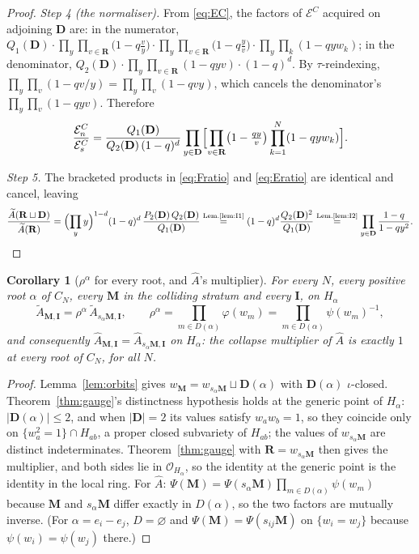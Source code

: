 \documentclass[11pt]{article}
\newtheorem{cor}[thm]{Corollary}
\theoremstyle{definition}
\newcommand{\At}{\widetilde{A}}
\newcommand{\Ah}{\widehat{A}}
\newcommand{\bM}{\mathbf{M}}
\newcommand{\bI}{\mathbf{I}}
\newcommand{\bD}{\mathbf{D}}
\newcommand{\bR}{\mathbf{R}}
\begin{document}
\begin{proof}
\emph{Step 4 (the normaliser).}  From \eqref{eq:EC}, the factors of
$\mathcal{E}^{C}$ acquired on adjoining $\bD$ are: in the numerator,
$Q_1(\bD)\cdot\prod_{y}\prod_{v\in\bR}\bigl(1-q\tfrac{v}{y}\bigr)
 \cdot\prod_y\prod_{v\in\bR}\bigl(1-q\tfrac{y}{v}\bigr)
 \cdot\prod_y\prod_{k}(1-qyw_k)$;
in the denominator, $Q_2(\bD)\cdot\prod_y\prod_{v\in\bR}(1-qyv)\cdot(1-q)^{d}$.
By $\tau$-reindexing, $\prod_{y}\prod_{v}(1-qv/y)=\prod_y\prod_v(1-qvy)$, which
cancels the denominator's $\prod_y\prod_v(1-qyv)$.  Therefore
\begin{equation}\label{eq:Eratio}
  \frac{\mathcal{E}^{C}_{n}}{\mathcal{E}^{C}_{s}}
  =\frac{Q_1(\bD)}{Q_2(\bD)\,(1-q)^{d}}
   \prod_{y\in\bD}\Bigl[\prod_{v\in\bR}\bigl(1-\tfrac{qy}{v}\bigr)
                        \prod_{k=1}^{N}(1-qyw_k)\Bigr].
\end{equation}

\emph{Step 5.}  The bracketed products in \eqref{eq:Fratio} and
\eqref{eq:Eratio} are identical and cancel, leaving
\[
  \frac{\At(\bR\sqcup\bD)}{\At(\bR)}
  =\Bigl(\prod_y y\Bigr)^{1-d}(1-q)^{d}\,\frac{P_2(\bD)\,Q_2(\bD)}{Q_1(\bD)}
  \overset{\text{Lem.\ref{lem:I1}}}{=}(1-q)^{d}\frac{Q_2(\bD)^{2}}{Q_1(\bD)}
  \overset{\text{Lem.\ref{lem:I2}}}{=}\prod_{y\in\bD}\frac{1-q}{1-qy^{2}} . \qedhere
\]
\end{proof}

\begin{cor}[$\rho^{\alpha}$ for every root, and $\Ah$'s multiplier]\label{cor:rho}
For every $N$, every positive root $\alpha$ of $C_N$, every $\bM$ in the colliding
stratum and every $\bI$, on $H_\alpha$
\[
   \At_{\bM,\bI}=\rho^{\alpha}\,\At_{s_\alpha\bM,\bI},
   \qquad
   \rho^{\alpha}=\prod_{m\in D(\alpha)}\varphi(w_m)=\prod_{m\in D(\alpha)}\psi(w_m)^{-1},
\]
and consequently $\Ah_{\bM,\bI}=\Ah_{s_\alpha\bM,\bI}$ on $H_\alpha$: the
collapse multiplier of $\Ah$ is exactly $1$ at every root of $C_N$, for all $N$.
\end{cor}

\begin{proof}
Lemma~\ref{lem:orbits} gives $w_{\bM}=w_{s_\alpha\bM}\sqcup\bD(\alpha)$ with
$\bD(\alpha)$ $\iota$-closed.  Theorem~\ref{thm:gauge}'s distinctness hypothesis
holds at the generic point of $H_\alpha$: $|\bD(\alpha)|\le2$, and when
$|\bD|=2$ its values satisfy $w_aw_b=1$, so they coincide only on
$\{w_a^{2}=1\}\cap H_{ab}$, a proper closed subvariety of $H_{ab}$; the values of
$w_{s_\alpha\bM}$ are distinct indeterminates.  Theorem~\ref{thm:gauge} with
$\bR=w_{s_\alpha\bM}$ then gives the multiplier, and both sides lie in
$\mathcal{O}_{H_\alpha}$, so the identity at the generic point is the identity in
the local ring.  For $\Ah$: $\Psi(\bM)=\Psi(s_\alpha\bM)
\prod_{m\in D(\alpha)}\psi(w_m)$ because $\bM$ and $s_\alpha\bM$ differ exactly
in $D(\alpha)$, so the two factors are mutually inverse.  (For
$\alpha=e_i-e_j$, $D=\varnothing$ and $\Psi(\bM)=\Psi(s_{ij}\bM)$ on
$\{w_i=w_j\}$ because $\psi(w_i)=\psi(w_j)$ there.)
\end{proof}
\end{document}
